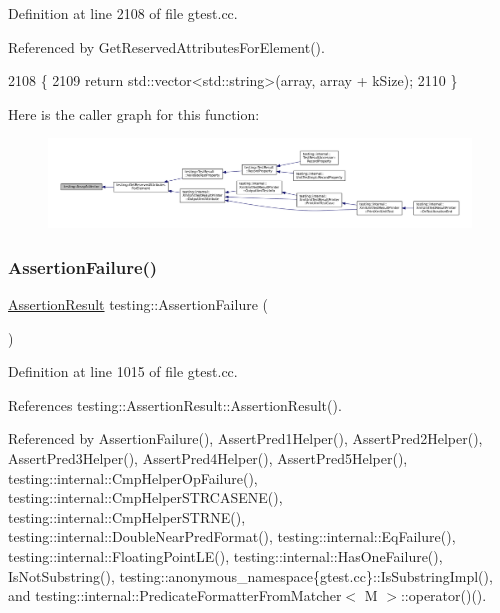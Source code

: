Definition at line 2108 of file gtest.\+cc.



Referenced by Get\+Reserved\+Attributes\+For\+Element().


\begin{DoxyCode}
2108                                                                       \{
2109   \textcolor{keywordflow}{return} std::vector<std::string>(array, array + kSize);
2110 \}
\end{DoxyCode}
Here is the caller graph for this function\+:
\nopagebreak
\begin{figure}[H]
\begin{center}
\leavevmode
\includegraphics[width=350pt]{namespacetesting_a956d4c522454fa6dfd75b5bbbefe8f9e_icgraph}
\end{center}
\end{figure}
\mbox{\label{namespacetesting_a75cb789614cb1c28c34627a4a3c053df}} 
\subsubsection{\texorpdfstring{Assertion\+Failure()}{AssertionFailure()}\hspace{0.1cm}{\footnotesize\ttfamily [1/2]}}
{\footnotesize\ttfamily \hyperlink{classtesting_1_1AssertionResult}{Assertion\+Result} testing\+::\+Assertion\+Failure (\begin{DoxyParamCaption}{ }\end{DoxyParamCaption})}



Definition at line 1015 of file gtest.\+cc.



References testing\+::\+Assertion\+Result\+::\+Assertion\+Result().



Referenced by Assertion\+Failure(), Assert\+Pred1\+Helper(), Assert\+Pred2\+Helper(), Assert\+Pred3\+Helper(), Assert\+Pred4\+Helper(), Assert\+Pred5\+Helper(), testing\+::internal\+::\+Cmp\+Helper\+Op\+Failure(), testing\+::internal\+::\+Cmp\+Helper\+S\+T\+R\+C\+A\+S\+E\+N\+E(), testing\+::internal\+::\+Cmp\+Helper\+S\+T\+R\+N\+E(), testing\+::internal\+::\+Double\+Near\+Pred\+Format(), testing\+::internal\+::\+Eq\+Failure(), testing\+::internal\+::\+Floating\+Point\+L\+E(), testing\+::internal\+::\+Has\+One\+Failure(), Is\+Not\+Substring(), testing\+::anonymous\+\_\+namespace\{gtest.\+cc\}\+::\+Is\+Substring\+Impl(), and testing\+::internal\+::\+Predicate\+Formatter\+From\+Matcher$<$ M $>$\+::operator()().


